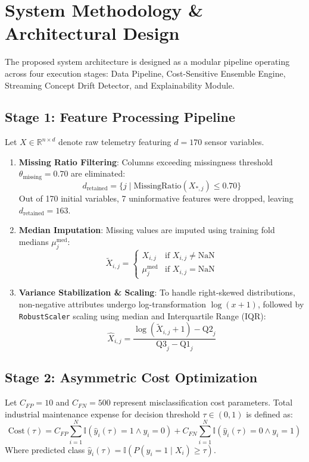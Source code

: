 \documentclass[journal]{IEEEtran}
\begin{document}
\section{System Methodology \& Architectural Design}
The proposed system architecture is designed as a modular pipeline operating across four execution stages: Data Pipeline, Cost-Sensitive Ensemble Engine, Streaming Concept Drift Detector, and Explainability Module.

\subsection{Stage 1: Feature Processing Pipeline}
Let $X \in \mathbb{R}^{n \times d}$ denote raw telemetry featuring $d = 170$ sensor variables.
\begin{enumerate}
    \item \textbf{Missing Ratio Filtering}: Columns exceeding missingness threshold $\theta_{\text{missing}} = 0.70$ are eliminated:
    \begin{equation}
    d_{\text{retained}} = \{ j \mid \text{MissingRatio}(X_{*,j}) \le 0.70 \}
    \end{equation}
    Out of 170 initial variables, 7 uninformative features were dropped, leaving $d_{\text{retained}} = 163$.
    \item \textbf{Median Imputation}: Missing values are imputed using training fold medians $\mu_{j}^{\text{med}}$:
    \begin{equation}
    \tilde{X}_{i,j} = \begin{cases} X_{i,j} & \text{if } X_{i,j} \ne \text{NaN} \\ \mu_{j}^{\text{med}} & \text{if } X_{i,j} = \text{NaN} \end{cases}
    \end{equation}
    \item \textbf{Variance Stabilization \& Scaling}: To handle right-skewed distributions, non-negative attributes undergo log-transformation $\log(x + 1)$, followed by \texttt{RobustScaler} scaling using median and Interquartile Range (IQR):
    \begin{equation}
    \hat{X}_{i,j} = \frac{\log(\tilde{X}_{i,j} + 1) - \text{Q2}_j}{\text{Q3}_j - \text{Q1}_j}
    \end{equation}
\end{enumerate}

\subsection{Stage 2: Asymmetric Cost Optimization}
Let $C_{FP} = 10$ and $C_{FN} = 500$ represent misclassification cost parameters. Total industrial maintenance expense for decision threshold $\tau \in (0, 1)$ is defined as:
\begin{equation}
\text{Cost}(\tau) = C_{FP} \sum_{i=1}^{N} \mathbb{I}(\hat{y}_i(\tau) = 1 \land y_i = 0) + C_{FN} \sum_{i=1}^{N} \mathbb{I}(\hat{y}_i(\tau) = 0 \land y_i = 1)
\end{equation}
Where predicted class $\hat{y}_i(\tau) = \mathbb{I}(P(y_i=1 \mid X_i) \ge \tau)$.
\end{document}
